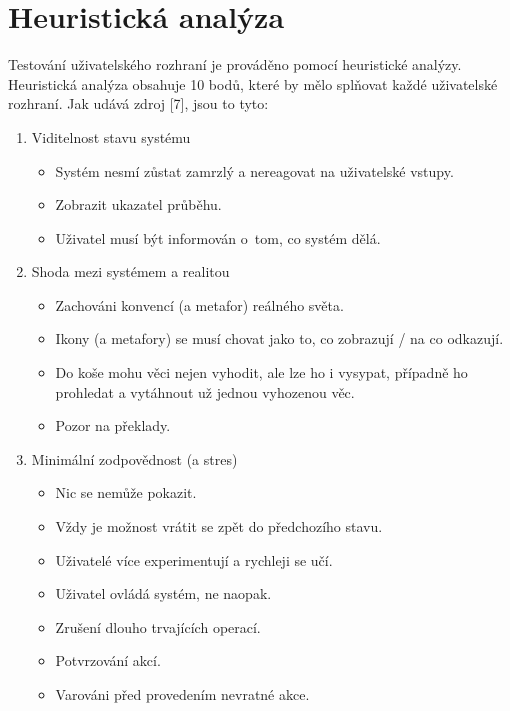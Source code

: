 \section{Heuristická analýza}

\label{nur:test}

Testování uživatelského rozhraní je prováděno pomocí heuristické analýzy. Heuristická analýza obsahuje 10 bodů, které by mělo splňovat každé uživatelské rozhraní. Jak udává zdroj [7], jsou to tyto:

\begin{enumerate}
    \item Viditelnost stavu systému
        \begin{itemize}
            \item Systém nesmí zůstat zamrzlý a nereagovat na uživatelské vstupy.
            \item Zobrazit ukazatel průběhu.
            \item Uživatel musí být informován o~tom, co systém dělá.
        \end{itemize}
    \item Shoda mezi systémem a realitou
        \begin{itemize}
            \item Zachováni konvencí (a metafor) reálného světa.
            \item Ikony (a metafory) se musí chovat jako to, co zobrazují / na co odkazují.
            \item Do koše mohu věci nejen vyhodit, ale lze ho i vysypat, případně ho prohledat a vytáhnout už jednou vyhozenou věc.
            \item Pozor na překlady.
        \end{itemize}
    \item Minimální zodpovědnost (a stres)
        \begin{itemize}
            \item Nic se nemůže pokazit.
            \item Vždy je možnost vrátit se zpět do předchozího stavu.
            \item Uživatelé více experimentují a rychleji se učí.
            \item Uživatel ovládá systém, ne naopak.
            \item Zrušení dlouho trvajících operací.
            \item Potvrzování akcí.
            \item Varováni před provedením nevratné akce.

\end{itemize}
\end{enumerate}
